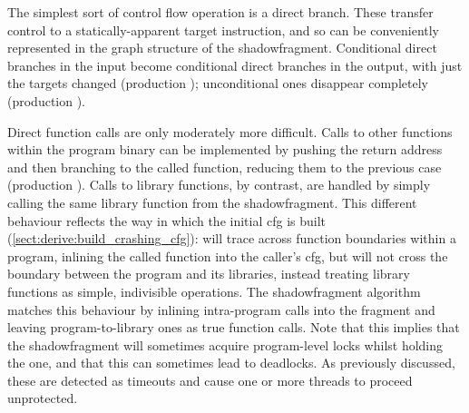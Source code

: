 The simplest sort of control flow operation is a direct branch.  These
transfer control to a statically-apparent target instruction, and so
can be conveniently represented in the graph structure of the
\gls{shadowfragment}.  Conditional direct branches in the input become
conditional direct branches in the output, with just the targets
changed (production ); unconditional ones disappear
completely (production ).

Direct function calls are only moderately more difficult.  Calls to
other functions within the program binary can be implemented by
pushing the return address and then branching to the called function,
reducing them to the previous case (production ).
Calls to library functions, by contrast, are handled by simply calling
the same library function from the \gls{shadowfragment}.  This
different behaviour reflects the way in which the initial \gls{cfg} is
built (\autoref{sect:derive:build_crashing_cfg}): {\technique} will
trace across function boundaries within a program, inlining the called
function into the caller's \gls{cfg}, but will not cross the boundary
between the program and its libraries, instead treating library
functions as simple, indivisible operations.  The \gls{shadowfragment}
algorithm matches this behaviour by inlining intra-program calls into
the fragment and leaving program-to-library ones as true function
calls.  Note that this implies that the \gls{shadowfragment} will
sometimes acquire program-level locks whilst holding the {\technique}
one, and that this can sometimes lead to deadlocks.  As previously
discussed, these are detected as timeouts and cause one or more
threads to proceed unprotected.

